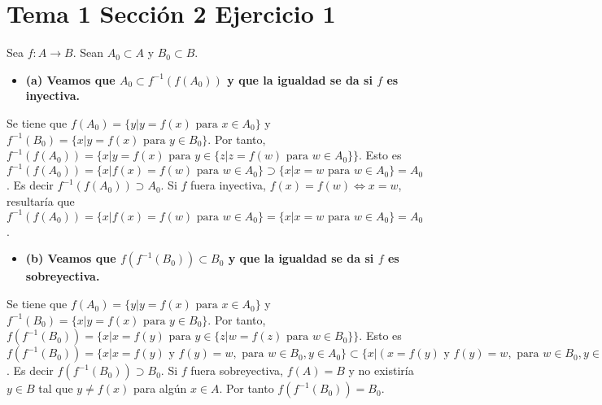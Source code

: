 \documentclass{article}
\begin{document}
\section{Tema 1 Sección 2 Ejercicio 1}
Sea $f:A\rightarrow B$. Sean $A_0\subset A$ y $B_0\subset B$.
\begin{itemize}
\item \bf (a) \rm Veamos que $A_0\subset f^{-1}(f(A_0))$  y que la igualdad se da si $f$ es inyectiva.
\end{itemize}
Se tiene que $f(A_0)=\{y|y=f(x)\text{ para }x\in A_0\}$ y $f^{-1}(B_0)=\{x|y=f(x)\text{ para }y\in B_0\}$. Por tanto, $f^{-1}(f(A_0))=\{x|y=f(x)\text{ para }y\in \{z|z=f(w)\text{ para }w\in A_0\}\}$. Esto es $f^{-1}(f(A_0))=\{x|f(x)=f(w)\text{ para }w\in A_0\}\supset \{x|x=w\text{ para }w\in A_0\}=A_0$. Es decir  $f^{-1}(f(A_0))\supset A_0$. Si $f$ fuera inyectiva, $f(x)=f(w)\Leftrightarrow x=w$,  resultaría que $f^{-1}(f(A_0))=\{x|f(x)=f(w)\text{ para }w\in A_0\}= \{x|x=w\text{ para }w\in A_0\}=A_0$.
\begin{itemize}
\item \bf (b) \rm Veamos que $f(f^{-1}(B_0))\subset B_0$  y que la igualdad se da si $f$ es sobreyectiva.
\end{itemize}
Se tiene que $f(A_0)=\{y|y=f(x)\text{ para }x\in A_0\}$ y $f^{-1}(B_0)=\{x|y=f(x)\text{ para }y\in B_0\}$. Por tanto, $f(f^{-1}(B_0))=\{x|x=f(y)\text{ para }y\in \{z|w=f(z)\text{ para }w\in B_0\}\}$. Esto es $f(f^{-1}(B_0))=\{x|x=f(y)\text{ y } f(y)= w,\text{ para }w\in B_0, y\in A_0\}\subset \{x|(x=f(y)\text{ y } f(y)= w ,\text{ para }w\in B_0, y\in A_0)\text{ o }(x=w\neq f(y)\text{ para }w\in B_0, y\in A_0)\}=\{x|x=w\text{ para }w\in B_0\}=B_0$. Es decir  $f(f^{-1}(B_0))\supset B_0$. Si $f$ fuera sobreyectiva, $f(A)=B$ y no existiría $y\in B$ tal que $ y\neq f(x)$ para algún $x\in A$. Por tanto $f(f^{-1}(B_0))=B_0$.
\end{document}

